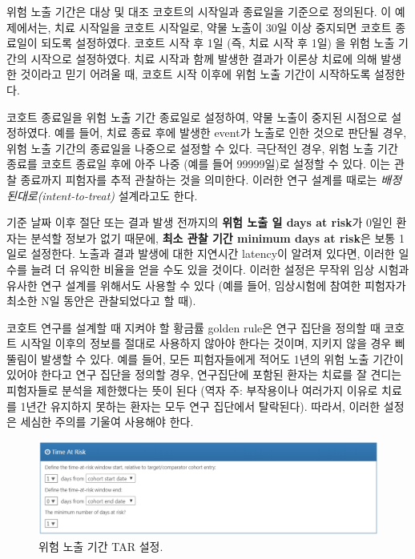 \documentclass[11pt]{book}
\theoremstyle{definition}
\theoremstyle{definition}
\theoremstyle{definition}
\theoremstyle{remark}
\let\BeginKnitrBlock\begin \let\EndKnitrBlock\end
\begin{document}
위험 노출 기간은 대상 및 대조 코호트의 시작일과 종료일을 기준으로
정의된다. 이 예제에서는, 치료 시작일을 코호트 시작일로, 약물 노출이 30일
이상 중지되면 코호트 종료일이 되도록 설정하였다. 코호트 시작 후 1일 (즉,
치료 시작 후 1일) 을 위험 노출 기간의 시작으로 설정하였다. 치료 시작과
함께 발생한 결과가 이론상 치료에 의해 발생한 것이라고 믿기 어려울 때,
코호트 시작 이후에 위험 노출 기간이 시작하도록 설정한다.

코호트 종료일을 위험 노출 기간 종료일로 설정하여, 약물 노출이 중지된
시점으로 설정하였다. 예를 들어, 치료 종료 후에 발생한 event가 노출로
인한 것으로 판단될 경우, 위험 노출 기간의 종료일을 나중으로 설정할 수
있다. 극단적인 경우, 위험 노출 기간 종료를 코호트 종료일 후에 아주 나중
(예를 들어 99999일)로 설정할 수 있다. 이는 관찰 종료까지 피험자를 추적
관찰하는 것을 의미한다. 이러한 연구 설계를 때로는
\emph{배정된대로(intent-to-treat)} 설계라고도 한다.

기준 날짜 이후 절단 또는 결과 발생 전까지의 \textbf{위험 노출 일 days at
risk}가 0일인 환자는 분석할 정보가 없기 때문에, \textbf{최소 관찰 기간
minimum days at risk}은 보통 1일로 설정한다. 노출과 결과 발생에 대한
지연시간 latency이 알려져 있다면, 이러한 일수를 늘려 더 유익한 비율을
얻을 수도 있을 것이다. 이러한 설정은 무작위 임상 시험과 유사한 연구
설계를 위해서도 사용할 수 있다 (예를 들어, 임상시험에 참여한 피험자가
최소한 N일 동안은 관찰되었다고 할 때).

\BeginKnitrBlock{rmdimportant}
코호트 연구를 설계할 때 지켜야 할 황금률 golden rule은 연구 집단을
정의할 때 코호트 시작일 이후의 정보를 절대로 사용하지 않아야 한다는
것이며, 지키지 않을 경우 삐뚤림이 발생할 수 있다. 예를 들어, 모든
피험자들에게 적어도 1년의 위험 노출 기간이 있어야 한다고 연구 집단을
정의할 경우, 연구집단에 포함된 환자는 치료를 잘 견디는 피험자들로 분석을
제한했다는 뜻이 된다 (역자 주: 부작용이나 여러가지 이유로 치료를 1년간
유지하지 못하는 환자는 모두 연구 집단에서 탈락된다). 따라서, 이러한
설정은 세심한 주의를 기울여 사용해야 한다.
\EndKnitrBlock{rmdimportant}

\begin{figure}

{\centering \includegraphics[width=1\linewidth]{images/PopulationLevelEstimation/timeAtRisk} 

}

\caption{위험 노출 기간 TAR 설정.}\label{fig:timeAtRisk}
\end{figure}
\end{document}
